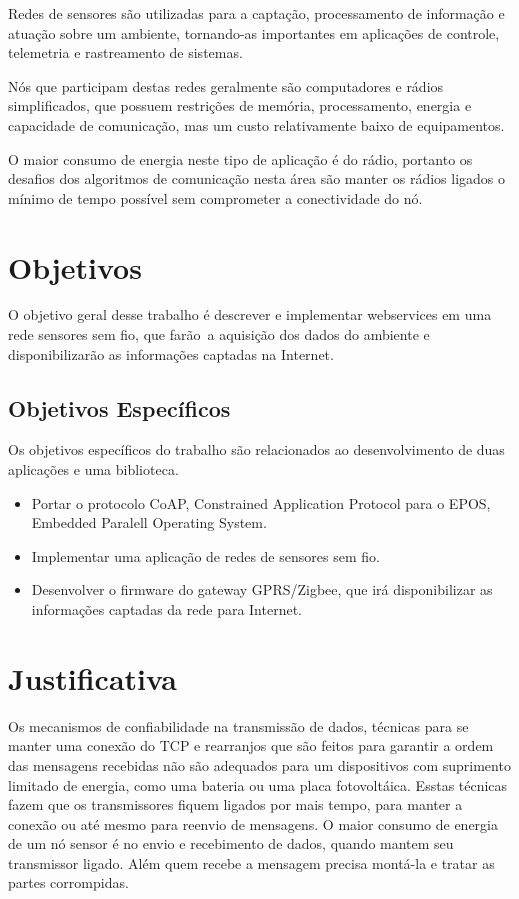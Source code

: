 Redes de sensores s\~ao utilizadas para a capta\c{c}\~ao, processamento de informa\c{c}\~ao e atua\c{c}\~ao sobre um ambiente, tornando-as importantes em aplica\c{c}\~oes de controle, telemetria e rastreamento de sistemas.

N\'os que participam destas redes geralmente s\~ao computadores e r\'adios simplificados, que possuem restri\c{c}\~oes de mem\'oria, processamento, energia e capacidade de comunica\c{c}\~ao, mas um custo relativamente baixo de equipamentos.

O maior consumo de energia neste tipo de aplica\c{c}\~ao \'e do r\'adio, portanto os desafios dos algoritmos de comunica\c{c}\~ao nesta \'area s\~ao manter os r\'adios ligados o m\'inimo de tempo poss\'ivel sem comprometer a conectividade do n\'o.

\section{Objetivos}
O objetivo geral desse trabalho \'e descrever e implementar webservices em uma rede sensores sem fio, que far\~ao\
a aquisi\c{c}\~ao dos dados do ambiente e disponibilizar\~ao as informa\c{c}\~oes captadas na Internet.

\subsection{Objetivos Espec\'ificos}
Os objetivos espec\'ificos do trabalho s\~ao relacionados ao desenvolvimento de duas aplica\c{c}\~oes e uma biblioteca.


\begin{itemize}
    \item Portar o protocolo CoAP, Constrained Application Protocol para o EPOS, Embedded Paralell Operating System.
    \item Implementar uma aplica\c{c}\~ao de redes de sensores sem fio.
    \item Desenvolver o firmware do  gateway GPRS/Zigbee, que ir\'a disponibilizar as informa\c{c}\~oes captadas da rede para Internet.
\end{itemize}
        

\section{Justificativa}

Os mecanismos de confiabilidade na transmiss\~ao de dados, t\'ecnicas para se manter uma conex\~ao do TCP e rearranjos que s\~ao feitos para garantir a ordem das mensagens recebidas n\~ao s\~ao adequados para um dispositivos com suprimento limitado de energia, como uma bateria ou uma placa fotovolt\'aica. Esstas t\'ecnicas fazem que os transmissores fiquem ligados por mais tempo, para manter a conex\~ao ou at\'e mesmo para reenvio de mensagens. O maior consumo de energia de um n\'o sensor \'e no envio e recebimento de dados, quando mantem seu transmissor ligado. Al\'em quem recebe a mensagem precisa mont\'a-la e tratar as partes corrompidas.

